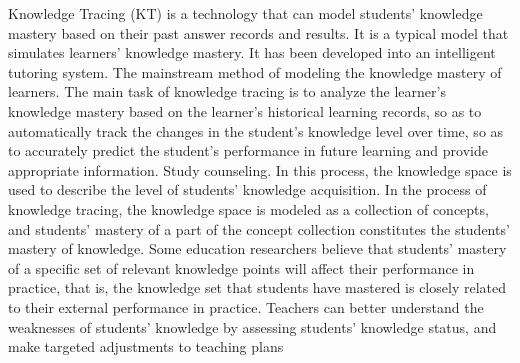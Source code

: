 
Knowledge Tracing (KT) is a technology that can model students' knowledge mastery based on their past answer records and results. It is a typical model that simulates learners' knowledge mastery. It has been developed into an intelligent tutoring system. The mainstream method of modeling the knowledge mastery of learners. The main task of knowledge tracing is to analyze the learner's knowledge mastery based on the learner's historical learning records, so as to automatically track the changes in the student's knowledge level over time, so as to accurately predict the student's performance in future learning and provide appropriate information. Study counseling. In this process, the knowledge space is used to describe the level of students' knowledge acquisition. In the process of knowledge tracing, the knowledge space is modeled as a collection of concepts, and students' mastery of a part of the concept collection constitutes the students' mastery of knowledge. Some education researchers believe that students' mastery of a specific set of relevant knowledge points will affect their performance in practice, that is, the knowledge set that students have mastered is closely related to their external performance in practice. Teachers can better understand the weaknesses of students' knowledge by assessing students' knowledge status, and make targeted adjustments to teaching plans

